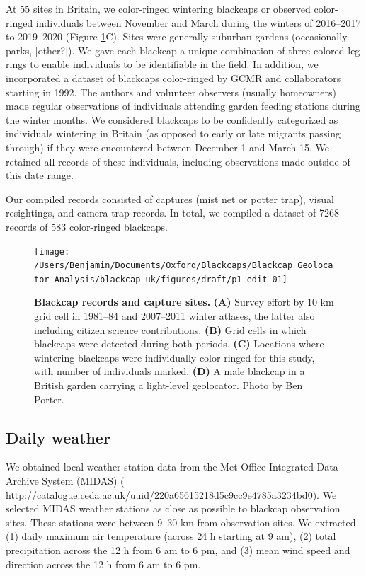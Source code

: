 \documentclass[a4paper, twoside]{templates/ociamthesis}
\begin{document}
At 55 sites in Britain, we color-ringed wintering blackcaps or observed color-ringed individuals between November and March during the winters of 2016--2017 to 2019--2020 (Figure \ref{fig:site-fig}C). Sites were generally suburban gardens (occasionally parks, {[}other?{]}). We gave each blackcap a unique combination of three colored leg rings to enable individuals to be identifiable in the field. In addition, we incorporated a dataset of blackcaps color-ringed by GCMR and collaborators starting in 1992. The authors and volunteer observers (usually homeowners) made regular observations of individuals attending garden feeding stations during the winter months. We considered blackcaps to be confidently categorized as individuals wintering in Britain (as opposed to early or late migrants passing through) if they were encountered between December 1 and March 15. We retained all records of these individuals, including observations made outside of this date range.

Our compiled records consisted of captures (mist net or potter trap), visual resightings, and camera trap records. In total, we compiled a dataset of 7268 records of 583 color-ringed blackcaps.



\begin{figure}
\texttt{[image: /Users/Benjamin/Documents/Oxford/Blackcaps/Blackcap\_Geolocator\_Analysis/blackcap\_uk/figures/draft/p1\_edit-01]} \caption{\textbf{Blackcap records and capture sites.} \textbf{(A)} Survey effort by 10 km grid cell in 1981--84 and 2007--2011 winter atlases, the latter also including citizen science contributions. \textbf{(B)} Grid cells in which blackcaps were detected during both periods. \textbf{(C)} Locations where wintering blackcaps were individually color-ringed for this study, with number of individuals marked. \textbf{(D)} A male blackcap in a British garden carrying a light-level geolocator. Photo by Ben Porter.}\label{fig:site-fig}
\end{figure}

\hypertarget{daily-weather}{%
\subsection{Daily weather}\label{daily-weather}}

We obtained local weather station data from the Met Office Integrated Data Archive System (MIDAS) \autocite{metofficeMetOfficeIntegrated2012} ( \url{http://catalogue.ceda.ac.uk/uuid/220a65615218d5c9cc9e4785a3234bd0}). We selected MIDAS weather stations as close as possible to blackcap observation sites. These stations were between 9--30 km from observation sites. We extracted (1) daily maximum air temperature (across 24 h starting at 9 am), (2) total precipitation across the 12 h from 6 am to 6 pm, and (3) mean wind speed and direction across the 12 h from 6 am to 6 pm.
\end{document}
